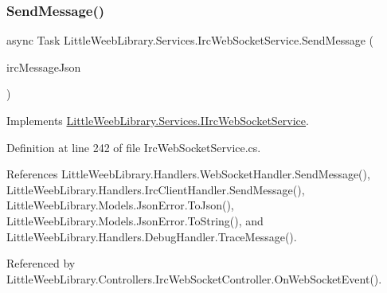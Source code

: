 \mbox{\label{class_little_weeb_library_1_1_services_1_1_irc_web_socket_service_aa9fcd18dc123e1356049b4b95bbaf2ff}} 
\subsubsection{\texorpdfstring{Send\+Message()}{SendMessage()}}
{\footnotesize\ttfamily async Task Little\+Weeb\+Library.\+Services.\+Irc\+Web\+Socket\+Service.\+Send\+Message (\begin{DoxyParamCaption}\item[{J\+Object}]{irc\+Message\+Json }\end{DoxyParamCaption})}



Implements \mbox{\hyperlink{interface_little_weeb_library_1_1_services_1_1_i_irc_web_socket_service_a79d2a4282565f178600ba77fac451e9f}{Little\+Weeb\+Library.\+Services.\+I\+Irc\+Web\+Socket\+Service}}.



Definition at line 242 of file Irc\+Web\+Socket\+Service.\+cs.



References Little\+Weeb\+Library.\+Handlers.\+Web\+Socket\+Handler.\+Send\+Message(), Little\+Weeb\+Library.\+Handlers.\+Irc\+Client\+Handler.\+Send\+Message(), Little\+Weeb\+Library.\+Models.\+Json\+Error.\+To\+Json(), Little\+Weeb\+Library.\+Models.\+Json\+Error.\+To\+String(), and Little\+Weeb\+Library.\+Handlers.\+Debug\+Handler.\+Trace\+Message().



Referenced by Little\+Weeb\+Library.\+Controllers.\+Irc\+Web\+Socket\+Controller.\+On\+Web\+Socket\+Event().


